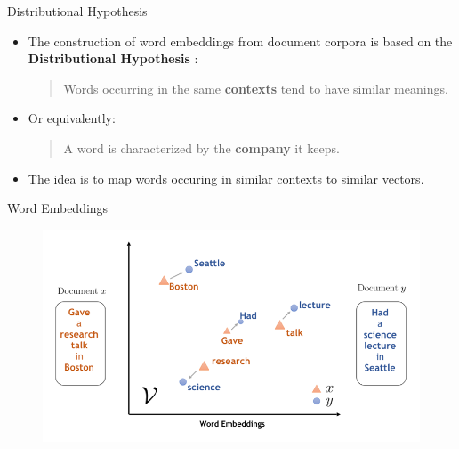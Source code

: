\documentclass[handout]{beamer}
\begin{document}
\begin{frame}{Distributional Hypothesis}
\begin{scriptsize}
\begin{itemize}
\item The construction of word embeddings from document corpora is based on the  \textbf{Distributional Hypothesis} \cite{harris1954}:
\begin{quote}
 Words occurring in the same \textbf{contexts} tend to have similar meanings.
\end{quote}

\item Or equivalently:
\begin{quote}
A word is characterized by the \textbf{company} it keeps.
\end{quote}


\item The idea is to map words occuring in similar contexts to similar vectors.

\end{itemize}
\end{scriptsize}
\end{frame}


\begin{frame}{Word Embeddings}
\begin{figure}[h]
  \includegraphics[scale=0.7]{pics/embeddings2.png}
\end{figure}



\end{frame}
\end{document}
